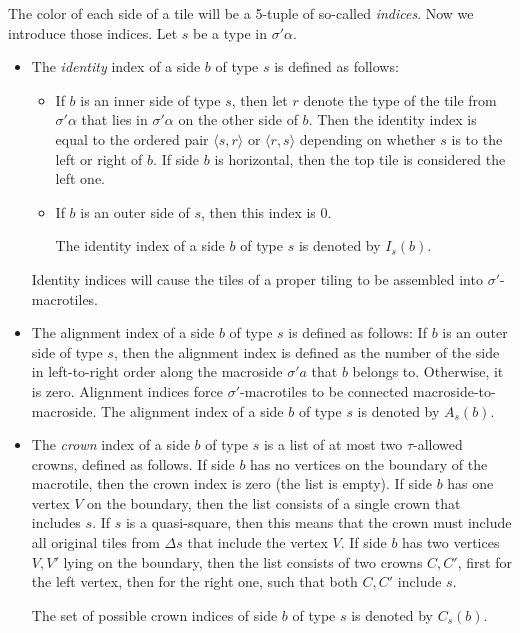 \documentclass[12pt]{article}
\theoremstyle{remark}
\newcommand{\pair}[1]{\langle #1\rangle}
\begin{document}
The color of each side of a tile will be a 5-tuple 
of  so-called \emph{indices}. Now we introduce those indices.
Let $s$ be a type in $\sigma'\alpha$.

\begin{itemize}
\item The \emph{identity} index of a side $b$ of type $s$ is defined as follows:
\begin{itemize}
\item \label{redind} If $b$ is an inner side of type $s$,
then let $r$ denote the type
of the tile from $\sigma'\alpha$ that lies in $\sigma'\alpha$ on the other side of $b$.
Then the identity index
is equal to the ordered pair $\pair{s,r}$ or $\pair{r,s}$
depending on whether $s$ is to the left or right of $b$.
If side $b$ is horizontal, then the top tile is considered the left one.

\item
If $b$ is an outer side of $s$, then this index is 0.

The 
identity index of a side $b$ of type $s$
is denoted by $I_s(b)$.
\end{itemize}
Identity indices will cause the tiles of a proper tiling
to be assembled into $\sigma'$-macrotiles.
\item The alignment index of a side $b$ of type $s$ is defined as follows:
If $b$ is an outer side of type $s$,
then the alignment index is defined as the number of the side in left-to-right order
along the macroside $\sigma' a$ that $b$ belongs to.
Otherwise, it is zero. Alignment indices force
$\sigma'$-macrotiles to be connected macroside-to-macroside.
The alignment index of a side $b$ of type $s$
is denoted by $A_s(b)$.
\item
The  \emph{crown} index of a side $b$ of type $s$ is a list
of at most two
$\tau$-allowed crowns, defined as follows.
If side $b$ has no vertices
on the boundary of the macrotile, then the crown index is zero (the list is empty).
If side $b$ has one vertex $V$ on the boundary, then
the list consists of a single crown that includes $s$. If $s$ is a quasi-square, then this means that the
crown must include all original tiles from $\Delta s$ that include the vertex $V$. 
If side $b$ has two vertices $V,V'$ lying on the boundary, then
the list consists of two crowns $C,C'$, first for the left vertex, then for the right one, 
such that both $C,C'$ include $s$. 

The set of possible crown indices of side $b$ of type $s$
is denoted by $C_s(b)$.
\end{itemize}
\end{document}
